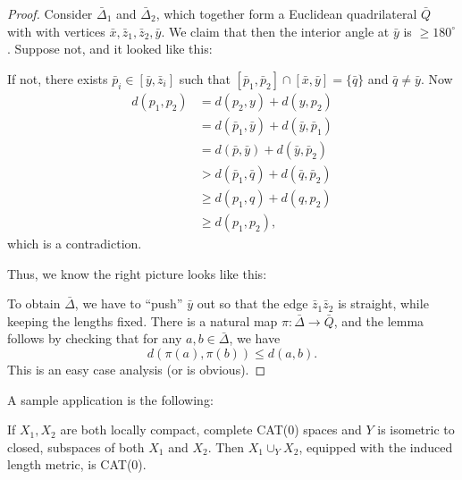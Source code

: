 \documentclass[a4paper]{article}
\begin{document}
\begin{proof}
  Consider $\bar{\Delta}_1$ and $\bar{\Delta}_2$, which together form a Euclidean quadrilateral $\bar{Q}$ with with vertices $\bar{x}, \bar{z}_1, \bar{z}_2, \bar{y}$. We claim that then the interior angle at $\bar{y}$ is $\geq 180^\circ$. Suppose not, and it looked like this:
  \begin{center}
  \end{center}
  If not, there exists $\bar{p}_i \in [\bar{y}, \bar{z}_i]$ such that $[\bar{p}_1, \bar{p}_2] \cap [\bar{x}, \bar{y}] = \{\bar{q}\}$ and $\bar{q} \not= \bar{y}$. Now
  \begin{align*}
    d(p_1, p_2) &= d(p_2, y) + d(y, p_2) \\
    &= d(\bar{p}_1, \bar{y}) + d(\bar{y}, \bar{p}_1)\\
    &= d(\bar{p}, \bar{y}) + d(\bar{y}, \bar{p}_2)\\
    &> d(\bar{p}_1, \bar{q}) + d(\bar{q}, \bar{p}_2)\\
    &\geq d(p_1, q) + d(q, p_2)\\
    &\geq d(p_1, p_2),
  \end{align*}
  which is a contradiction.

  Thus, we know the right picture looks like this:
  \begin{center}
  \end{center}
  To obtain $\bar{\Delta}$, we have to ``push'' $\bar{y}$ out so that the edge $\bar{z}_1 \bar{z}_2$ is straight, while keeping the lengths fixed. There is a natural map $\pi: \bar{\Delta} \to \bar{Q}$, and the lemma follows by checking that for any $a, b \in \bar{\Delta}$, we have
  \[
    d(\pi(a), \pi(b)) \leq d(a, b).
  \]
  This is an easy case analysis (or is obvious).
\end{proof}

A sample application is the following:
\begin{prop}
  If $X_1, X_2$ are both locally compact, complete CAT(0) spaces and $Y$ is isometric to closed, subspaces of both $X_1$ and $X_2$. Then $X_1 \cup_Y X_2$, equipped with the induced length metric, is CAT(0).
\end{prop}
\end{document}
